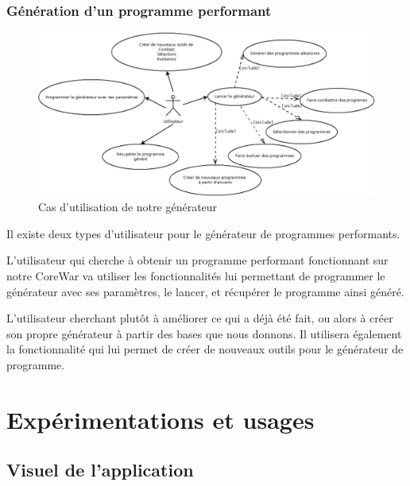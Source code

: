 \documentclass[hidelinks]{report}
\begin{document}
\subsection{Génération d'un programme performant}
\begin{figure}
    \centering
    \includegraphics[scale=0.5]{images/diagrammes/casutilisationGP.png}
    \caption{Cas d'utilisation de notre générateur}
    \label{fig:casutilGP}
\end{figure}

Il existe deux types d'utilisateur pour le générateur de programmes performants.

L'utilisateur qui cherche à obtenir un programme performant fonctionnant sur notre CoreWar va utiliser les fonctionnalités lui permettant de programmer le générateur avec ses paramètres, le lancer, et récupérer le programme ainsi généré.

L'utilisateur cherchant plutôt à améliorer ce qui a déjà été fait, ou alors à créer son propre générateur à partir des bases que nous donnons. Il utilisera également la fonctionnalité qui lui permet de créer de nouveaux outils pour le générateur de programme.

\chapter{Expérimentations et usages}

\section{Visuel de l'application}
\end{document}
